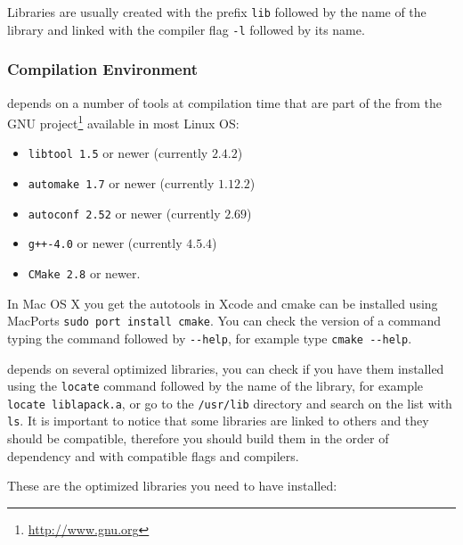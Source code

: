 Libraries are usually created with the prefix \verb!lib! followed by the name of the library
and linked with the compiler flag \verb!-l! followed by its name. 

\subsubsection{Compilation Environment}
\label{sec:comp-envir}

\lifev depends on a number of tools at compilation time that are part
of the  from the GNU project\footnote{\url{http://www.gnu.org}} 
available in most Linux OS:

\begin{itemize}
\item \verb!libtool 1.5! or newer (currently $2.4.2$)%
\item \verb!automake 1.7! or newer (currently $1.12.2$)%
\item \verb!autoconf 2.52! or newer (currently $2.69$)%
\item \verb!g++-4.0! or newer (currently $4.5.4$)%
\item \verb!CMake 2.8! or newer.
\end{itemize}

In Mac OS X you get the autotools in Xcode and cmake can be 
installed using MacPorts \verb!sudo port install cmake!. You can check the version of a command typing the command followed by \verb!--help!, 
for example type \verb!cmake --help!. 

\lifev depends on several optimized libraries, you can check if you have them installed 
using the \verb!locate! command followed by the name of the library, for example 
\verb!locate liblapack.a!, or go to the \verb!/usr/lib! directory and search on the 
list with \verb!ls!. 
It is important to notice that some libraries are linked to others and they should 
be compatible, therefore you should build them in the order of dependency and with 
compatible flags and compilers. 

These are the optimized libraries you need to have installed:

